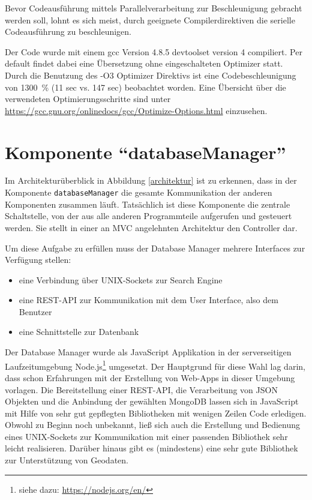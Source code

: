 \documentclass[10pt,a4paper]{report}
\begin{document}
Bevor Codeausführung mittels Parallelverarbeitung zur Beschleunigung gebracht werden soll, lohnt es sich meist, durch geeignete Compilerdirektiven die serielle Codeausführung zu beschleunigen.

Der Code wurde mit einem gcc Version 4.8.5 devtoolset version 4 compiliert. Per default findet dabei eine Übersetzung ohne eingeschalteten Optimizer statt. 
Durch die Benutzung des -O3 Optimizer Direktivs ist eine Codebeschleunigung von 1300~\% (11 sec vs. 147 sec) beobachtet worden. 
Eine Übersicht über die verwendeten Optimierungsschritte sind unter \href{https://gcc.gnu.org/onlinedocs/gcc/Optimize-Options.html}{https://gcc.gnu.org/onlinedocs/gcc/Optimize-Options.html} einzusehen.

\chapter{Komponente "`databaseManager"'}

Im Architekturüberblick in Abbildung \ref{architektur} ist zu erkennen, dass in der Komponente \texttt{databaseManager} die gesamte Kommunikation der anderen Komponenten zusammen läuft. Tatsächlich ist diese Komponente die zentrale Schaltstelle, von der aus alle anderen Programmteile aufgerufen und gesteuert werden. Sie stellt in einer an MVC angelehnten Architektur den Controller dar.

Um diese Aufgabe zu erfüllen muss der Database Manager mehrere Interfaces zur Verfügung stellen:
\begin{itemize}
	\item eine Verbindung über UNIX-Sockets zur Search Engine
	\item eine REST-API zur Kommunikation mit dem User Interface, also dem Benutzer
	\item eine Schnittstelle zur Datenbank
\end{itemize}

Der Database Manager wurde als JavaScript Applikation in der serverseitigen Laufzeitumgebung Node.js\footnote{siehe dazu: \href{https://nodejs.org/en/}{https://nodejs.org/en/}} umgesetzt. Der Hauptgrund für diese Wahl lag darin, dass schon Erfahrungen mit der Erstellung von Web-Apps in dieser Umgebung vorlagen. Die Bereitstellung einer REST-API, die Verarbeitung von JSON Objekten und die Anbindung der gewählten MongoDB lassen sich in JavaScript mit Hilfe von sehr gut gepflegten Bibliotheken mit wenigen Zeilen Code erledigen. Obwohl zu Beginn noch unbekannt, ließ sich auch die Erstellung und Bedienung eines UNIX-Sockets zur Kommunikation mit einer passenden Bibliothek sehr leicht realisieren.
Darüber hinaus gibt es (mindestens) eine sehr gute Bibliothek zur Unterstützung von Geodaten. 
\end{document}
